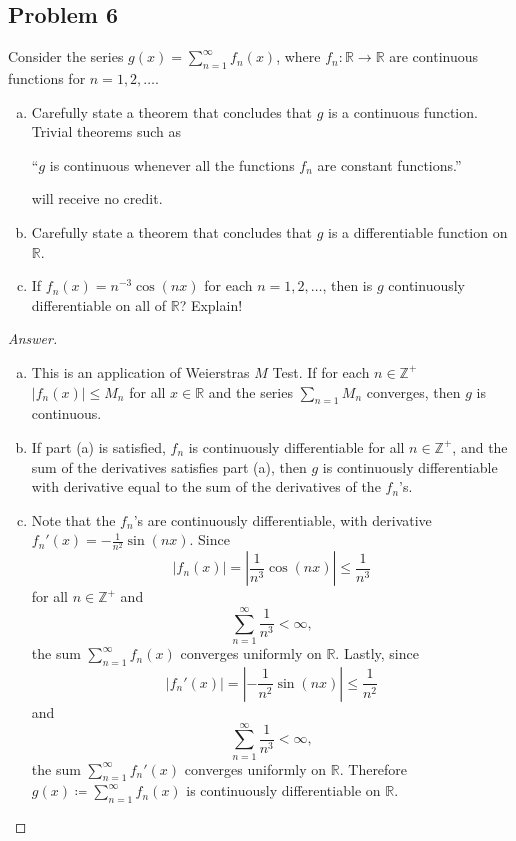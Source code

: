 \documentclass[12pt]{article}
\newcommand{\z}{\mathbb{Z}}
\newcommand{\real}{\mathbb{R}}
\theoremstyle{definition}
\begin{document}
\subsection{Problem 6 \texorpdfstring{\cite{PZ}}{}}
Consider the series $\displaystyle g(x) = \sum\limits_{n = 1}^{\infty} f_n(x)$, where $f_n : \real \to \real$ are continuous functions for $n = 1 , 2 , \dotsc$.
\begin{enumerate}[a.]
    \item Carefully state a theorem that concludes that $g$ is a continuous function. Trivial theorems such as 
    
    ``$g$ is continuous whenever all the functions $f_n$ are constant functions.''
    
    will receive no credit.
    \item Carefully state a theorem that concludes that $g$ is a differentiable function on $\real$.
    \item If $f_n(x) = n^{-3} \cos(nx)$ for each $n = 1 , 2 , \dotsc$, then is $g$ continuously differentiable on all of $\real$? Explain!
\end{enumerate}
\begin{proof}[Answer]
    \noindent
    \begin{enumerate}[a.]
        \item This is an application of Weierstras $M$ Test. If for each $n \in \z^+$ $|f_n(x)| \leq M_n$ for all $x \in \real$ and the series $\sum\limits_{n = 1}M_n$ converges, then $g$ is continuous. 
        \item If part (a) is satisfied, $f_n$ is continuously differentiable for all $n \in \z^+$, and the sum of the derivatives satisfies part (a), then $g$ is continuously differentiable with derivative equal to the sum of the derivatives of the $f_n$'s.
        \item Note that the $f_n$'s are continuously differentiable, with derivative $f_n'(x) = -\frac{1}{n^2} \sin(nx)$. Since
        \[
            |f_n(x)| = \left| \frac{1}{n^3} \cos(nx) \right| \leq \frac{1}{n^3}
        \]
        for all $n \in \z^+$ and 
        \[
            \sum\limits_{n = 1}^{\infty} \frac{1}{n^3} < \infty,
        \]
        the sum $\sum\limits_{n = 1}^{\infty} f_n(x)$ converges uniformly on $\real$. Lastly, since 
        \[
            |f_n'(x)| = \left| -\frac{1}{n^2} \sin(nx) \right| \leq \frac{1}{n^2}
        \]
        and 
        \[
            \sum\limits_{n = 1}^{\infty} \frac{1}{n^3} < \infty,
        \]
        the sum $\sum\limits_{n = 1}^{\infty} f_n'(x)$ converges uniformly on $\real$. Therefore $g(x) \coloneqq \sum\limits_{n = 1}^{\infty} f_n(x)$ is continuously differentiable on $\real$. 
    \end{enumerate}
\end{proof}
\newpage
\end{document}
